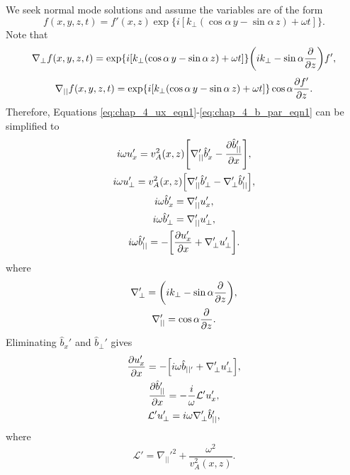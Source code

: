 We seek normal mode solutions and assume the variables are of the form
\[f(x,y,z,t) = f'(x,z)\exp\{i[k_\perp(\cos\alpha\,y - \sin\alpha\,z)+\omega t]\}.\]
Note that
\[\nabla_\perp f(x,y,z,t) = \exp\{i[k_\perp(\cos\alpha\,y - \sin\alpha\,z)+\omega t]\}\qty(ik_\perp - \sin\alpha\pdv{}{z})f',\]
\[\nabla_{||} f(x,y,z,t) = \exp\{i[k_\perp(\cos\alpha\,y - \sin\alpha\,z)+\omega t]\}\cos\alpha\pdv{f'}{z} .\]
Therefore, Equations \eqref{eq:chap_4_ux_eqn1}-\eqref{eq:chap_4_b_par_eqn1} can be simplified to
\begin{gather}
    i\omega u_x'=v_A^2(x,z)\qty[\nabla_{||}'\hat{b}_x' - \pdv{\hat{b}_{||}'}{x}], \\
    i\omega u_\perp'=v_A^2(x,z)\qty[\nabla_{||}'\hat{b}_\perp'-\nabla_\perp' \hat{b}_{||}'], \\
    i\omega \hat{b}_x'=\nabla_{||}'u_x', \\
    i\omega \hat{b}_\perp'=\nabla_{||}'u_{\perp}', \\
    i\omega \hat{b}_{||}'=-\qty[\pdv{u_x'}{x}+\nabla_\perp' u_{\perp}'].
\end{gather}
where
\begin{gather}
    \nabla_\perp' = \qty(ik_\perp - \sin\alpha\pdv{}{z}), \\
    \nabla_{||}' = \cos\alpha\pdv{}{z}.
\end{gather}
Eliminating $\hat{b}_x'$ and $\hat{b}_\perp'$ gives
\begin{gather}
    \label{eq:chap4_ux_eqn_DAE}
    \pdv{u_x'}{x} = -\qty[i\omega \hat{b}_{||'} + \nabla_\perp' u_\perp'], \\
    \label{eq:chap4_b_par_eqn_DAE}
    \pdv{\hat{b}_{||}'}{x} = -\frac{i}{\omega}\mathcal{L}'u_x', \\
    \label{eq:chap4_u_perp_eqn_DAE}
    \mathcal{L}'u_\perp' = i\omega \nabla_\perp' \hat{b}_{||}',
\end{gather}
where
\begin{equation}
    \mathcal{L}' = \nabla_{||}'^2+\frac{\omega^2}{v_A^2(x,z)}.
\end{equation}

